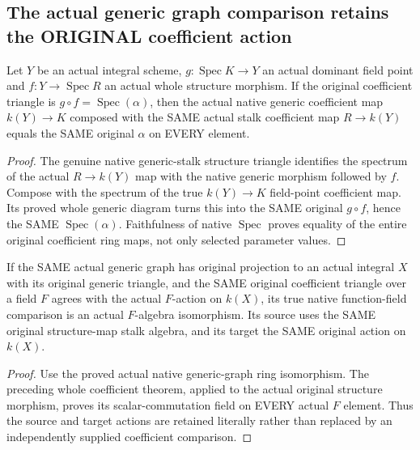 \subsection{The actual generic graph comparison retains the ORIGINAL coefficient action}

\begin{theorem}
\label{scheme:generic-field-original-coefficients}
\leanok
{}
Let $Y$ be an actual integral scheme, $g:\operatorname{Spec}K\to Y$
an actual dominant field point and $f:Y\to\operatorname{Spec}R$ an
actual whole structure morphism. If the original coefficient triangle is
$g\circ f=\operatorname{Spec}(\alpha)$, then the actual native generic
coefficient map $k(Y)\to K$ composed with the SAME actual stalk coefficient
map $R\to k(Y)$ equals the SAME original $\alpha$ on EVERY element.
\end{theorem}
\begin{proof}
The genuine native generic-stalk structure triangle identifies the spectrum
of the actual $R\to k(Y)$ map with the native generic morphism followed by
$f$. Compose with the spectrum of the true $k(Y)\to K$ field-point
coefficient map. Its proved whole generic diagram turns this into the SAME
original $g\circ f$, hence the SAME $\operatorname{Spec}(\alpha)$.
Faithfulness of native $\operatorname{Spec}$ proves equality of the entire
original coefficient ring maps, not only selected parameter values.
\end{proof}

\begin{definition}
\label{scheme:generic-graph-original-coefficient-algequiv}
\leanok
{}
If the SAME actual generic graph has original projection to an actual
integral $X$ with its original generic triangle, and the SAME original
coefficient triangle over a field $F$ agrees with the actual $F$-action on
$k(X)$, its true native function-field comparison is an actual
$F$-algebra isomorphism. Its source uses the SAME original structure-map
stalk algebra, and its target the SAME original action on $k(X)$.
\end{definition}
\begin{proof}
Use the proved actual native generic-graph ring isomorphism. The preceding
whole coefficient theorem, applied to the actual original structure
morphism, proves its scalar-commutation field on EVERY actual $F$ element.
Thus the source and target actions are retained literally rather than
replaced by an independently supplied coefficient comparison.
\end{proof}
